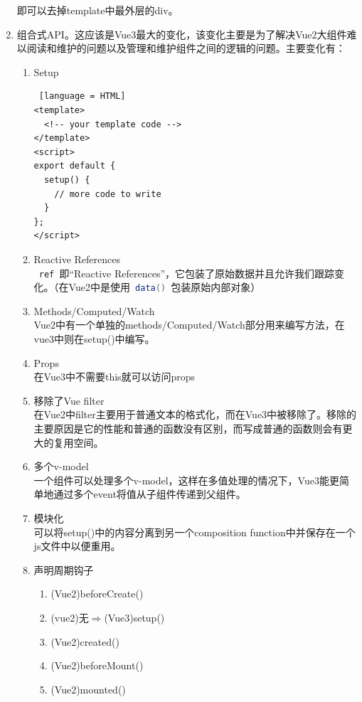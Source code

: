 \begin{enumerate}
  即可以去掉template中最外层的div。
  \item 组合式API。这应该是Vue3最大的变化，该变化主要是为了解决Vue2大组件难以阅读和维护的问题以及管理和维护组件之间的逻辑的问题。主要变化有：
        \begin{enumerate}[label=\circled{\arabic*}]
          \item Setup
                \begin{lstlisting} [language = HTML]
<template>
  <!-- your template code -->
</template>
<script>
export default {
  setup() {
    // more code to write
  }
};
</script>
            \end{lstlisting}
          \item Reactive References\\
                \lstinline[language = Java]| ref |即“Reactive References”，它包装了原始数据并且允许我们跟踪变化。（在Vue2中是使用\lstinline[language = Java]| data() |包装原始内部对象）
          \item Methods/Computed/Watch\\
                Vue2中有一个单独的methods/Computed/Watch部分用来编写方法，在vue3中则在setup()中编写。
          \item Props\\
                在Vue3中不需要this就可以访问props
          \item 移除了Vue filter\\
                在Vue2中filter主要用于普通文本的格式化，而在Vue3中被移除了。移除的主要原因是它的性能和普通的函数没有区别，而写成普通的函数则会有更大的复用空间。
          \item 多个v-model\\
                一个组件可以处理多个v-model，这样在多值处理的情况下，Vue3能更简单地通过多个event将值从子组件传递到父组件。
          \item 模块化\\
                可以将setup()中的内容分离到另一个composition function中并保存在一个js文件中以便重用。
          \item 声明周期钩子
                \begin{enumerate}
                  \item (Vue2)beforeCreate()
                  \item (vue2)无$\Rightarrow$(Vue3)setup()
                  \item (Vue2)created()
                  \item (Vue2)beforeMount()
                  \item (Vue2)mounted()

\end{enumerate}
\end{enumerate}
\end{enumerate}
